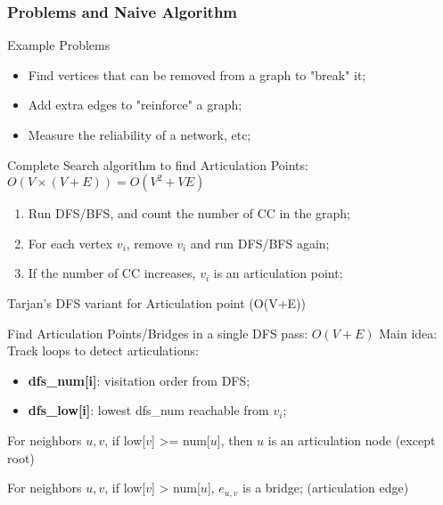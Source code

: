 \begin{frame}
  \frametitle{Problems and Naive Algorithm}
  \begin{exampleblock}{Example Problems}
    \begin{itemize}
      \item Find vertices that can be removed from a graph to "break" it;
      \item Add extra edges to "reinforce" a graph;
      \item Measure the reliability of a network, etc;
    \end{itemize}
  \end{exampleblock}\medskip

  \begin{block}{Complete Search algorithm to find Articulation Points: $O(V\times(V+E)) = O(V^2+VE)$}
  \begin{enumerate}
    \item Run DFS/BFS, and count the number of CC in the graph;
    \item For each vertex $v_i$, remove $v_i$ and run DFS/BFS again;
    \item If the number of CC increases, $v_i$ is an articulation point;
  \end{enumerate}
  \end{block}
\end{frame}

\begin{frame}{Tarjan's DFS variant for Articulation point (O(V+E))}
  \begin{exampleblock}{Find Articulation Points/Bridges in a single DFS pass: $O(V+E)$}
    Main idea: Track loops to detect articulations:
    \begin{itemize}
    \item {\bf dfs\_num[i]}: visitation order from DFS;
    \item {\bf dfs\_low[i]}: lowest dfs\_num reachable from $v_i$;
    \end{itemize}\bigskip

    For neighbors $u,v$, if low[$v$] >= num[$u$], then $u$ is an articulation node (except root)\bigskip

    For neighbors $u,v$, if low[$v$] > num[$u$], $e_{u,v}$ is a bridge; (articulation edge)
  \end{exampleblock}
\end{frame}

%

